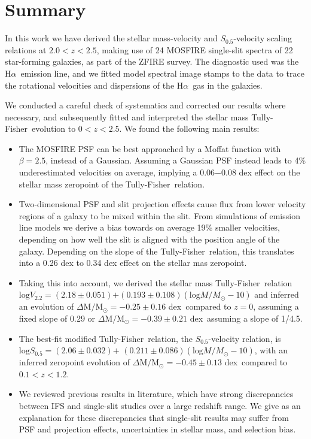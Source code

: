 \documentclass{emulateapj}
\newcommand{\ha}{H$\alpha$}
\newcommand{\msun}{$\mathrm{M_{\odot}}$}
\newcommand{\tf}{Tully-Fisher}
\newcommand{\bc}{$(2.18\pm0.051)$}%
\newcommand{\afree}{$(0.193\pm0.108)$}
\newcommand{\ev}{$\Delta \mathrm{M}/$\msun$=-0.25\pm0.16$ dex}
\newcommand{\evbell}{$\Delta \mathrm{M}/$\msun$=-0.39\pm0.21$ dex}
\newcommand{\bsfree}{$(2.06\pm0.032)$}
\newcommand{\asfree}{$(0.211\pm0.086)$}
\newcommand{\sev}{$\Delta \mathrm{M}/$\msun$=-0.45\pm0.13$ dex}
\begin{document}
{ \section{Summary}
 
In this work we have derived the stellar mass-velocity and $S_{0.5}$-velocity scaling relations at $2.0<z<2.5$, making use of 24 MOSFIRE single-slit spectra of 22 star-forming galaxies, as part of the ZFIRE survey. The diagnostic used was the \ha\ emission line, and we fitted model spectral image stamps to the data to trace the rotational velocities and dispersions of the \ha\ gas in the galaxies.

We conducted a careful check of systematics and corrected our results where necessary, and subsequently fitted and interpreted the stellar mass \tf\ evolution to $0 < z < 2.5$. We found the following main results:
\begin{itemize}
\item The MOSFIRE PSF can be best approached by a Moffat function with $\beta=2.5$, instead of a Gaussian. Assuming a Gaussian PSF instead leads to 4\% underestimated velocities on average, implying a 0.06$-0.08$ dex effect on the stellar mass zeropoint of the \tf\ relation.
\item Two-dimensional PSF and slit projection effects cause flux from lower velocity regions of a galaxy to be mixed within the slit. {From simulations of emission line models we derive a bias towards} {on average 19}\% smaller velocities, {depending on how well the slit is aligned with the position angle of the galaxy. Depending on the slope of the \tf\ relation, this translates into a 0.26 dex to 0.34 dex effect on the stellar mas zeropoint}.
\item Taking this into account, we derived the stellar mass \tf\ relation $\mathrm{log}V_{2.2}=$\bc$+$\afree$(\mathrm{log}M/M_{\odot}-10)$ and inferred an evolution of \ev\ compared to $z=0${, assuming a fixed slope of 0.29 or \evbell\ assuming a slope of 1/4.5}.
\item The best-fit modified \tf\ relation, the $S_{0.5}$-velocity relation, is $\mathrm{log}S_{0.5}=$\bsfree$+$ \asfree$(\mathrm{log}M/M_{\odot}-10)$, with an inferred zeropoint evolution of \sev\ compared to $0.1<z<1.2$.
\item We reviewed previous results in literature, which have strong discrepancies between IFS and single-slit studies over a large redshift range. We give as an explanation for these discrepancies that single-slit results may suffer from PSF and projection effects{, uncertainties in stellar mass, and selection bias}. 

\end{itemize}}
\end{document}
